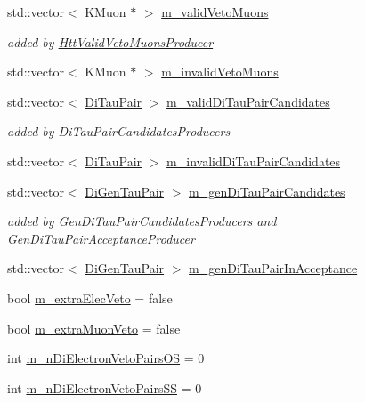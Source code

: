 \begin{DoxyCompactItemize}
std::vector$<$ KMuon $\ast$ $>$ \hyperlink{classHttProduct_ae4fc7a166cfb5909aedb1088bd7957c2}{m\_\-validVetoMuons}
\begin{DoxyCompactList}\small\item\em added by \hyperlink{classHttValidVetoMuonsProducer}{HttValidVetoMuonsProducer} \item\end{DoxyCompactList}\item 
std::vector$<$ KMuon $\ast$ $>$ \hyperlink{classHttProduct_abab9056d187c5418241eac5bd0f096ec}{m\_\-invalidVetoMuons}
\item 
std::vector$<$ \hyperlink{classDiTauPair}{DiTauPair} $>$ \hyperlink{classHttProduct_af59b7e6a1ea36e0e84b34d9bfbda2484}{m\_\-validDiTauPairCandidates}
\begin{DoxyCompactList}\small\item\em added by DiTauPairCandidatesProducers \item\end{DoxyCompactList}\item 
std::vector$<$ \hyperlink{classDiTauPair}{DiTauPair} $>$ \hyperlink{classHttProduct_ab3c39138bbc65d2e38906de8726f21b4}{m\_\-invalidDiTauPairCandidates}
\item 
std::vector$<$ \hyperlink{classDiGenTauPair}{DiGenTauPair} $>$ \hyperlink{classHttProduct_a0865735d27c7a69146e4edab092a4db2}{m\_\-genDiTauPairCandidates}
\begin{DoxyCompactList}\small\item\em added by GenDiTauPairCandidatesProducers and \hyperlink{classGenDiTauPairAcceptanceProducer}{GenDiTauPairAcceptanceProducer} \item\end{DoxyCompactList}\item 
std::vector$<$ \hyperlink{classDiGenTauPair}{DiGenTauPair} $>$ \hyperlink{classHttProduct_a327e2e641fe1ed7ffdbd16b115e1dfd5}{m\_\-genDiTauPairInAcceptance}
\item 
bool \hyperlink{classHttProduct_a1569de0dcfa961c09eecd41f9cbff856}{m\_\-extraElecVeto} = false
\item 
bool \hyperlink{classHttProduct_af4194179accc2aaaf06f6cd734c0622b}{m\_\-extraMuonVeto} = false
\item 
int \hyperlink{classHttProduct_ae33b3df3a4e4ac02097c818a11f3f319}{m\_\-nDiElectronVetoPairsOS} = 0
\item 
int \hyperlink{classHttProduct_ae5056eaf6e08614a971727bcc63b3a84}{m\_\-nDiElectronVetoPairsSS} = 0
\item 

\end{DoxyCompactItemize}
